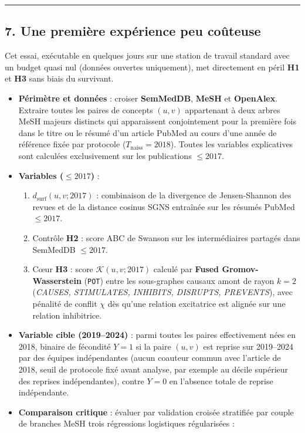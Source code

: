 \documentclass[a4paper,11pt]{article}
\providecommand{\tightlist}{\setlength{\itemsep}{0pt}\setlength{\parskip}{0pt}}
\begin{document}
\begin{center}\rule{0.5\linewidth}{0.5pt}\end{center}

\subsection*{7. Une première expérience peu coûteuse}

Cet essai, exécutable en quelques jours sur une station de travail
standard avec un budget quasi nul (données ouvertes uniquement), met
directement en péril \textbf{H1} et \textbf{H3} sans biais du survivant.

\begin{itemize}
\tightlist
\item
  \textbf{Périmètre et données} : croiser \textbf{SemMedDB},
  \textbf{MeSH} et \textbf{OpenAlex}. Extraire toutes les paires de
  concepts \((u,v)\) appartenant à deux arbres MeSH majeurs distincts
  qui apparaissent conjointement pour la première fois dans le titre ou
  le résumé d'un article PubMed au cours d'une année de référence fixée
  par protocole (\(T_{\text{naiss}} = 2018\)). Toutes les variables
  explicatives sont calculées exclusivement sur les publications
  \(\le 2017\).
\item
  \textbf{Variables (\(\le 2017\))} :

  \begin{enumerate}
  \def\labelenumi{\arabic{enumi}.}
  \tightlist
  \item
    \(d_{\text{surf}}(u, v; 2017)\) : combinaison de la divergence de
    Jensen-Shannon des revues et de la distance cosinus SGNS entraînée
    sur les résumés PubMed \(\le 2017\).
  \item
    Contrôle \textbf{H2} : score ABC de Swanson sur les intermédiaires
    partagés dans SemMedDB \(\le 2017\).
  \item
    Cœur \textbf{H3} : score \(\mathcal{K}(u, v; 2017)\) calculé par
    \textbf{Fused Gromov-Wasserstein} (\texttt{POT}) entre les
    sous-graphes causaux amont de rayon \(k=2\) (\emph{CAUSES,
    STIMULATES, INHIBITS, DISRUPTS, PREVENTS}), avec pénalité de conflit
    \(\chi\) dès qu'une relation excitatrice est alignée sur une
    relation inhibitrice.
  \end{enumerate}
\item
  \textbf{Variable cible (2019--2024)} : parmi toutes les paires
  effectivement nées en 2018, binaire de fécondité \(Y=1\) si la paire
  \((u,v)\) est reprise sur 2019--2024 par des équipes indépendantes
  (aucun coauteur commun avec l'article de 2018, seuil de protocole fixé
  avant analyse, par exemple au décile supérieur des reprises
  indépendantes), contre \(Y=0\) en l'absence totale de reprise
  indépendante.
\item
  \textbf{Comparaison critique} : évaluer par validation croisée
  stratifiée par couple de branches MeSH trois régressions logistiques
  régularisées :


\end{itemize}
\end{document}
